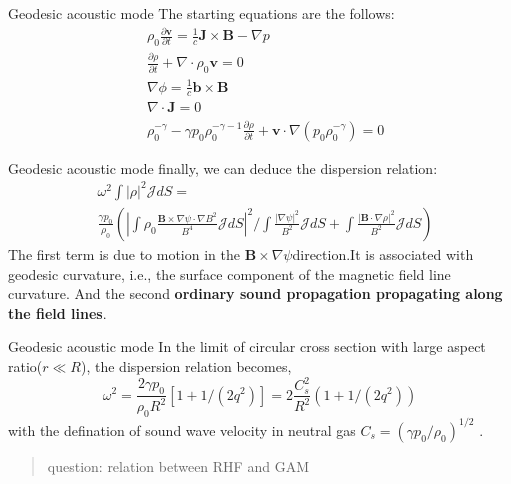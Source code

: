 \documentclass{beamer}
\begin{document}
\begin{frame}{Geodesic acoustic mode}
The starting equations are the follows:
\begin{equation}
\begin{aligned}
&\rho_0\frac{\partial{\pmb{v}}}{\partial{t}}=\frac{1}{c}\pmb{J}\times\pmb{B}-\nabla{p}	\\
&\frac{\partial\rho}{\partial{t}}+\nabla\cdot\rho_0\pmb{v}=0	\\
&\nabla\phi=\frac{1}{c}\pmb{b}\times\pmb{B}	\\
&\nabla\cdot\pmb{J}=0	\\
&\rho_0^{-\gamma}-\gamma{p_0}\rho_0^{-\gamma-1}\frac{\partial{\rho}}{\partial{t}}+\pmb{v}\cdot\nabla({p_0}\rho_0^{-\gamma})=0
\end{aligned}
\end{equation}	
\end{frame}

\begin{frame}{Geodesic acoustic mode}
finally, we can deduce the dispersion relation:
\begin{equation}
\begin{aligned}
& \omega^2\int{|\rho|^2}\mathcal{J}dS= \\ 
& \frac{\gamma{p_0}}{\rho_0}( |\int\rho_0\frac{\pmb{B}\times\nabla\psi\cdot\nabla{B^2}}{B^4}\mathcal{J}dS|^2/\int\frac{|\nabla\psi|^2}{B^2}\mathcal{J}dS + \int\frac{|\pmb{B}\cdot\nabla\rho|^2}{B^2}\mathcal{J}dS )
\end{aligned}
\end{equation}
The first term is due to motion in the $\pmb{B}\times\nabla\psi$direction.It is associated with geodesic curvature, i.e., the surface component of the magnetic field line curvature. And the second \textbf{ordinary sound propagation propagating along the field lines}.
\end{frame}


\begin{frame}{Geodesic acoustic mode}
In the limit of circular cross section with large aspect ratio($r\ll R$), the dispersion relation becomes,
\begin{equation}
\omega^2=\frac{2\gamma{p_0}}{\rho_0{R}^2}[1+1/(2q^2)]=2\frac{C_s^2}{R^2}(1+1/(2q^2))
\end{equation}
with the defination of sound wave velocity in neutral gas $C_s=(\gamma{p_0}/\rho_0)^{1/2}$ .

\begin{quote}
{\color{magenta} question: relation between RHF and GAM}
\end{quote}

\end{frame}
\end{document}
